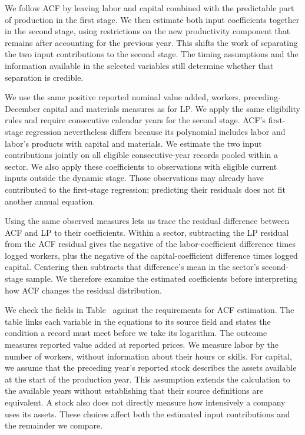 We follow ACF by leaving labor and capital combined with the predictable part of production in the first stage. We then estimate both input coefficients together in the second stage, using restrictions on the new productivity component that remains after accounting for the previous year. This shifts the work of separating the two input contributions to the second stage. The timing assumptions and the information available in the selected variables still determine whether that separation is credible.

We use the same positive reported nominal value added, workers, preceding-December capital and materials measures as for LP. We apply the same eligibility rules and require consecutive calendar years for the second stage. ACF's first-stage regression nevertheless differs because its polynomial includes labor and labor's products with capital and materials. We estimate the two input contributions jointly on all eligible consecutive-year records pooled within a sector. We also apply these coefficients to observations with eligible current inputs outside the dynamic stage. Those observations may already have contributed to the first-stage regression; predicting their residuals does not fit another annual equation.

Using the same observed measures lets us trace the residual difference between ACF and LP to their coefficients. Within a sector, subtracting the LP residual from the ACF residual gives the negative of the labor-coefficient difference times logged workers, plus the negative of the capital-coefficient difference times logged capital. Centering then subtracts that difference's mean in the sector's second-stage sample. We therefore examine the estimated coefficients before interpreting how ACF changes the residual distribution.

We check the fields in Table~ against the requirements for ACF estimation. The table links each variable in the equations to its source field and states the condition a record must meet before we take its logarithm.
The outcome measures reported value added at reported prices. We measure labor by the number of workers, without information about their hours or skills. For capital, we assume that the preceding year's reported stock describes the assets available at the start of the production year. This assumption extends the calculation to the available years without establishing that their source definitions are equivalent. A stock also does not directly measure how intensively a company uses its assets. These choices affect both the estimated input contributions and the remainder we compare.

